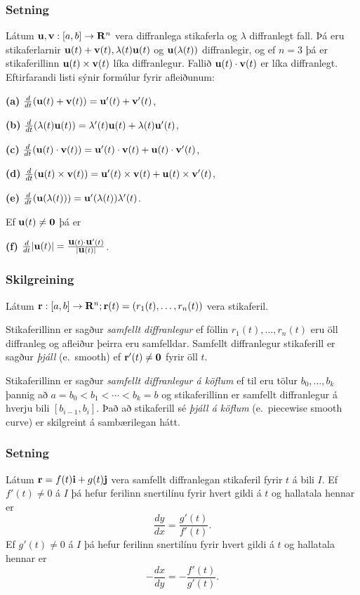 \subsubsection{\nopagebreak Setning }   Látum $\mbox{${\bf u}$},\mbox{${\bf v}$}:[a,b]\rightarrow \mbox{${\bf R}^n$}$ vera
diffranlega stikaferla og $\lambda$ diffranlegt fall.  Þá eru stikaferlarnir
$\mbox{${\bf u}$}(t)+\mbox{${\bf v}$}(t), \lambda(t)\mbox{${\bf u}$}(t)$ og $\mbox{${\bf u}$}(\lambda(t))$ diffranlegir,
og ef $n=3$ þá er stikaferillinn $\mbox{${\bf u}$}(t)\times \mbox{${\bf v}$}(t)$ líka diffranlegur.
Fallið $\mbox{${\bf u}$}(t)\cdot\mbox{${\bf v}$}(t)$ er líka diffranlegt.  Eftirfarandi listi sýnir
formúlur fyrir afleiðunum: 

{\bf (a)} $\frac{d}{dt}(\mbox{${\bf u}$}(t)+\mbox{${\bf v}$}(t))=\mbox{${\bf u}$}'(t)+\mbox{${\bf v}$}'(t)$,

{\bf (b)} $\frac{d}{dt}(\lambda(t)\mbox{${\bf u}$}(t))=\lambda'(t)\mbox{${\bf u}$}(t)+\lambda(t)\mbox{${\bf u}$}'(t)$,

{\bf (c)}  $\frac{d}{dt}(\mbox{${\bf u}$}(t)\cdot\mbox{${\bf v}$}(t))=\mbox{${\bf u}$}'(t)\cdot\mbox{${\bf v}$}(t)+\mbox{${\bf u}$}(t)\cdot\mbox{${\bf v}$}'(t)$,

{\bf (d)}  $\frac{d}{dt}(\mbox{${\bf u}$}(t)\times\mbox{${\bf v}$}(t))=\mbox{${\bf u}$}'(t)\times\mbox{${\bf v}$}(t)+\mbox{${\bf u}$}(t)\times\mbox{${\bf v}$}'(t)$,

{\bf (e)}  $\frac{d}{dt}(\mbox{${\bf u}$}(\lambda(t)))=\mbox{${\bf u}$}'(\lambda(t))\lambda'(t)$.

\noindent
Ef $\mbox{${\bf u}$}(t)\neq\mbox{${\bf 0}$}$ þá er 

{\bf (f)}  $\frac{d}{dt}|\mbox{${\bf u}$}(t)|=\frac{\mbox{${\bf u}$}(t)\cdot\mbox{${\bf u}$}'(t)}{|\mbox{${\bf u}$}(t)|}$.

\medskip

 

\subsubsection{Skilgreining }
Látum $\mbox{${\bf r}$}:  [a,b]\rightarrow \mbox{${\bf R}^n$}; \mbox{${\bf r}$}(t)=(r_1(t),\ldots,r_n(t))$ vera stikaferil.  

Stikaferillinn er sagður {\em samfellt diffranlegur} ef föllin
$r_1(t),\ldots,r_n(t)$ eru öll diffranleg og afleiður þeirra eru
samfelldar.  Samfellt diffranlegur stikaferill er sagður {\em þjáll}
(e.~smooth) ef $\mbox{${\bf r}$}'(t)\neq\mbox{${\bf 0}$}$ fyrir öll $t$. 

\medskip
Stikaferillinn er sagður {\em samfellt diffranlegur á köflum} ef til eru
tölur $b_0,\ldots,b_k$ þannig að  $a=b_0<b_1<\cdots<b_k=b$ og
stikaferillinn er samfellt diffranlegur á hverju bili $[b_{i-1}, b_i]$.
Það að stikaferill sé {\em þjáll á köflum}  
(e.~piecewise smooth curve) er
skilgreint á sambærilegan hátt. 


 \subsubsection{Setning}
Látum $\mbox{${\bf r}$}=f(t)\mbox{${\bf i}$}+g(t)\mbox{${\bf j}$}$ vera samfellt diffranlegan stikaferil fyrir $t$ á bili $I$. Ef $f'(t) \neq 0$ á $I$ þá hefur ferilinn snertilínu fyrir hvert gildi á $t$ og hallatala hennar er 
\begin {equation*}
 \frac{dy}{dx} = \frac{g'(t)}{f'(t)}.
\end {equation*}
Ef $g'(t) \neq 0$ á $I$ þá hefur ferilinn snertilínu fyrir hvert gildi á $t$ og hallatala hennar er
\begin {equation*}
 -\frac{dx}{dy} = -\frac{f'(t)}{g'(t)}.
\end {equation*}

